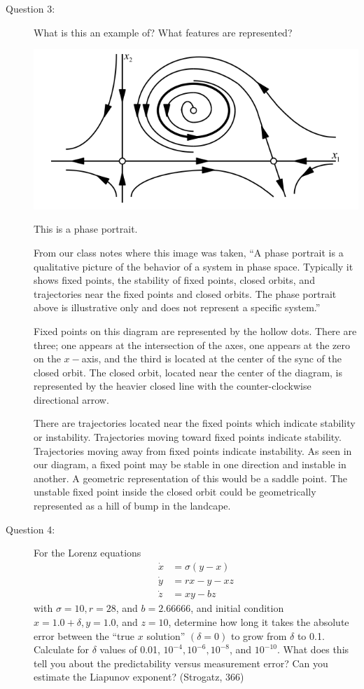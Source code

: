 \documentclass[letterpaper,10pt]{article}
\begin{document}
\begin{description}
\item[Question 3:]
What is this an example of?  What features are represented?
\begin{center}
  \includegraphics[scale=0.65]{images/phaseportrait.png}
\end{center}

This is a phase portrait.

From our class notes where this image was taken, ``A phase portrait is a qualitative picture of the behavior of a system in phase space.  Typically it shows fixed points, the stability of fixed points, closed orbits, and trajectories near the fixed points and closed orbits.  The phase portrait above is illustrative only and does not represent a specific system.''

Fixed points on this diagram are represented by the hollow dots. There are three; one appears at the intersection of the axes, one appears at the zero on the $x-$axis, and the third is located at the center of the sync of the closed orbit.  The closed orbit, located near the center of the diagram, is represented by the heavier closed line with the counter-clockwise directional arrow.

There are trajectories located near the fixed points which indicate stability or instability.  Trajectories moving toward fixed points indicate stability.  Trajectories moving away from fixed points indicate instability.  As seen in our diagram, a fixed point may be stable in one direction and instable in another.  A geometric representation of this would be a saddle point.  The unstable fixed point inside the closed orbit could be geometrically represented as a hill of bump in the
landcape.

\item[Question 4:]
For the Lorenz equations
\begin{align*}
\dot{x} &= \sigma(y-x) \\
\dot{y} &= rx-y-xz \\
\dot{z} &= xy-bz
\end{align*}
with $\sigma=10, r=28$, and $b=2.66666$, and initial condition $x=1.0+\delta, y=1.0$, and $z=10$, determine how long it takes the absolute error between the ``true $x$ solution'' $(\delta=0)$ to grow from $\delta$ to 0.1. Calculate for $\delta$ values of 0.01, $10^{-4}, 10^{-6}, 10^{-8}$, and $10^{-10}$.  What does this tell you about the predictability versus measurement error?  Can you estimate the Liapunov exponent? (Strogatz, 366)


\end{description}
\end{document}
